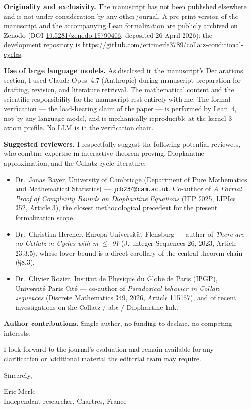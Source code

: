 \documentclass[11pt,a4paper]{article}
\begin{document}
\textbf{Originality and exclusivity.} The manuscript has not been published elsewhere and is not under consideration by any other journal. A pre-print version of the manuscript and the accompanying Lean formalization are publicly archived on Zenodo (DOI \href{https://doi.org/10.5281/zenodo.19790406}{10.5281/zenodo.19790406}, deposited 26 April 2026); the development repository is \url{https://github.com/ericmerle3789/collatz-conditional-cycles}.

\textbf{Use of large language models.} As disclosed in the manuscript's Declarations section, I used Claude Opus~4.7 (Anthropic) during manuscript preparation for drafting, revision, and literature retrieval. The mathematical content and the scientific responsibility for the manuscript rest entirely with me. The formal verification --- the load-bearing claim of the paper --- is performed by Lean~4, not by any language model, and is mechanically reproducible at the kernel-3 axiom profile. No LLM is in the verification chain.

\textbf{Suggested reviewers.} I respectfully suggest the following potential reviewers, who combine expertise in interactive theorem proving, Diophantine approximation, and the Collatz cycle literature:

\begin{itemize}
  \item Dr.\ Jonas Bayer, University of Cambridge (Department of Pure Mathematics and Mathematical Statistics) --- \texttt{jcb234@cam.ac.uk}. Co-author of \emph{A Formal Proof of Complexity Bounds on Diophantine Equations} (ITP 2025, LIPIcs 352, Article 3), the closest methodological precedent for the present formalization scope.
  \item Dr.\ Christian Hercher, Europa-Universität Flensburg --- author of \emph{There are no Collatz m-Cycles with m $\leq$ 91} (J.\ Integer Sequences 26, 2023, Article 23.3.5), whose lower bound is a direct corollary of the central theorem chain (§8.3).
  \item Dr.\ Olivier Rozier, Institut de Physique du Globe de Paris (IPGP), Université Paris Cité --- co-author of \emph{Paradoxical behavior in Collatz sequences} (Discrete Mathematics 349, 2026, Article 115167), and of recent investigations on the Collatz / abc / Diophantine link.
\end{itemize}

\textbf{Author contributions.} Single author, no funding to declare, no competing interests.

I look forward to the journal's evaluation and remain available for any clarification or additional material the editorial team may require.

\bigskip
\noindent
Sincerely,

\bigskip
\noindent
Eric Merle\\
Independent researcher, Chartres, France
\end{document}
